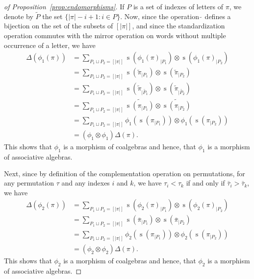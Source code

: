 \documentclass[a4paper]{llncs}
\DeclareMathOperator{\STD}{\mathrm{s}}
\begin{document}
\begin{proof}[of Proposition~\ref{prop:endomorphisms}]
    If $P$ is a set of indexes of letters of $\pi$, we denote by
    $\widetilde{P}$ the set $\{|\pi| - i  + 1 : i \in P\}$. Now, since
    the operation $\widetilde{\,}$ defines a bijection on the set of the
    subsets of $[|\pi|]$, and since the standardization operation
    commutes with the mirror operation on words without multiple
    occurrence of a letter, we have
    \begin{equation} \begin{split}
        \Delta(\phi_1(\pi))
        & = \sum_{P_1 \sqcup P_2 = [|\pi|]}
        \STD\left(\phi_1(\pi)_{|P_1}\right)
        \otimes \STD\left(\phi_1(\pi)_{|P_2}\right) \\
        & = \sum_{P_1 \sqcup P_2 = [|\pi|]}
        \STD\left(\widetilde{\pi}_{|P_1}\right)
        \otimes \STD\left(\widetilde{\pi}_{|P_2}\right) \\
        & = \sum_{P_1 \sqcup P_2 = [|\pi|]}
        \STD\left(\widetilde{\pi}_{|\widetilde{P_1}}\right)
        \otimes \STD\left(\widetilde{\pi}_{|\widetilde{P_2}}\right) \\
        & = \sum_{P_1 \sqcup P_2 = [|\pi|]}
        \widetilde{\STD\left(\pi_{|P_1}\right)}
        \otimes \widetilde{\STD\left(\pi_{|P_2}\right)} \\
        & = \sum_{P_1 \sqcup P_2 = [|\pi|]}
        \phi_1\left(\STD\left(\pi_{|P_1}\right)\right)
        \otimes \phi_1\left(\STD\left(\pi_{|P_2}\right)\right) \\
        & = (\phi_1 \otimes \phi_1) \Delta(\pi).
    \end{split} \end{equation}
    This shows that $\phi_1$ is a morphism of coalgebras and hence, that
    $\phi_1$ is a morphism of associative algebras.
    \smallskip

    Next, since by definition of the complementation operation on
    permutations, for any permutation $\tau$ and any indexes $i$ and $k$,
    we have $\tau_i < \tau_k$ if and only if $\bar \tau_i > \bar \tau_k$,
    we have
    \begin{equation} \begin{split}
        \Delta(\phi_2(\pi))
        & = \sum_{P_1 \sqcup P_2 = [|\pi|]}
        \STD\left(\phi_2(\pi)_{|P_1}\right)
        \otimes \STD\left(\phi_2(\pi)_{|P_2}\right) \\
        & = \sum_{P_1 \sqcup P_2 = [|\pi|]}
        \STD\left(\bar \pi_{|P_1}\right)
        \otimes \STD\left(\bar \pi_{|P_2}\right) \\
        & = \sum_{P_1 \sqcup P_2 = [|\pi|]}
        \phi_2\left(\STD\left(\pi_{|P_1}\right)\right)
        \otimes \phi_2\left(\STD\left(\pi_{|P_2}\right)\right) \\
        & = (\phi_2 \otimes \phi_2) \Delta(\pi).
    \end{split} \end{equation}
    This shows that $\phi_2$ is a morphism of coalgebras and hence, that
    $\phi_2$ is a morphism of associative algebras.
    \smallskip


\end{proof}
\end{document}
